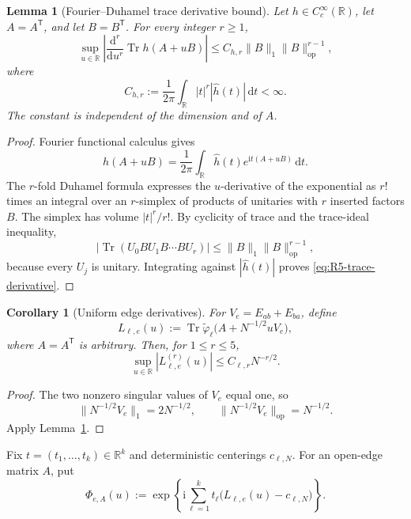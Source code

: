 \documentclass[11pt]{article}
\newtheorem{lemma}[theorem]{Lemma}
\newtheorem{corollary}[theorem]{Corollary}
\theoremstyle{definition}
\theoremstyle{remark}
\newcommand{\Tr}{\operatorname{Tr}}
\newcommand{\ii}{\mathrm i}
\newcommand{\dd}{\mathrm d}
\newcommand{\op}{\mathrm{op}}
\newcommand{\norm}[1]{\lVert #1\rVert}
\begin{document}
\begin{lemma}[Fourier--Duhamel trace derivative bound]
\label{lem:R5-Fourier-Duhamel}
Let \(h\in C_c^\infty(\mathbb R)\), let \(A=A^{\mathsf T}\), and let
\(B=B^{\mathsf T}\).  For every integer \(r\ge1\),
\begin{equation}\label{eq:R5-trace-derivative}
 \sup_{u\in\mathbb R}
 \left|\frac{\dd^r}{\dd u^r}\Tr h(A+uB)\right|
 \le
 C_{h,r}\norm{B}_1\norm{B}_{\op}^{r-1},
\end{equation}
where
\begin{equation}\label{eq:R5-Fourier-constant}
 C_{h,r}:=\frac1{2\pi}\int_{\mathbb R}
 |t|^r|\widehat h(t)|\,\dd t<\infty.
\end{equation}
The constant is independent of the dimension and of \(A\).
\end{lemma}

\begin{proof}
Fourier functional calculus gives
\[
 h(A+uB)=\frac1{2\pi}\int_{\mathbb R}
 \widehat h(t)e^{\ii t(A+uB)}\,\dd t.
\]
The \(r\)-fold Duhamel formula expresses the \(u\)-derivative of the
exponential as \(r!\) times an integral over an \(r\)-simplex of products of
unitaries with \(r\) inserted factors \(B\).  The simplex has volume
\(|t|^r/r!\).  By cyclicity of trace and the trace-ideal inequality,
\[
 |\Tr(U_0BU_1B\cdots BU_r)|
 \le\norm{B}_1\norm{B}_{\op}^{r-1},
\]
because every \(U_j\) is unitary.  Integrating against
\(|\widehat h(t)|\) proves \eqref{eq:R5-trace-derivative}.
\end{proof}

\begin{corollary}[Uniform edge derivatives]
\label{cor:R5-edge-derivatives}
For \(V_e=E_{ab}+E_{ba}\), define
\[
 L_{\ell,e}(u)
 :=\Tr\widetilde\varphi_\ell
 \bigl(A+N^{-1/2}uV_e\bigr),
\]
where \(A=A^{\mathsf T}\) is arbitrary.  Then, for \(1\le r\le5\),
\begin{equation}\label{eq:R5-L-derivatives}
 \sup_{u\in\mathbb R}|L_{\ell,e}^{(r)}(u)|
 \le C_{\ell,r}N^{-r/2}.
\end{equation}
\end{corollary}

\begin{proof}
The two nonzero singular values of \(V_e\) equal one, so
\[
 \norm{N^{-1/2}V_e}_1=2N^{-1/2},
 \qquad
 \norm{N^{-1/2}V_e}_{\op}=N^{-1/2}.
\]
Apply Lemma~\ref{lem:R5-Fourier-Duhamel}.
\end{proof}

Fix \(t=(t_1,\ldots,t_k)\in\mathbb R^k\) and deterministic centerings
\(c_{\ell,N}\).  For an open-edge matrix \(A\), put
\begin{equation}\label{eq:R5-Phi}
 \Phi_{e,A}(u)
 :=
 \exp\left\{
 \ii\sum_{\ell=1}^kt_\ell
 \bigl(L_{\ell,e}(u)-c_{\ell,N}\bigr)
 \right\}.
\end{equation}
\end{document}
